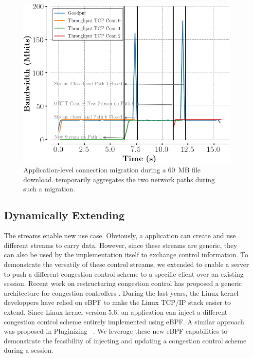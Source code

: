 \begin{figure}[!t]
  \begin{center}
    \includegraphics[width=\columnwidth]{figures/migration.png}
  \end{center}
\vspace{-0.5cm}
  \caption{Application-level connection migration during a 60~MB file download.
    \tcpls temporarily aggregates the two network paths during such a migration.}
  \label{fig:conn_migration}
\end{figure}



\subsection{Dynamically Extending \tcpls}

The \tcpls streams enable new use case. Obviously, a \tcpls application can
create and use different streams to carry data. However, since these streams
are generic, they can also be used by the \tcpls implementation itself to
exchange control information. To demonstrate the versatily of these control
streams, we extended \tcpls to enable a server to push a different congestion
control scheme to a specific client over an existing \tcpls session. Recent
work on restructuring congestion control has proposed a generic architecture
for congestion controllers \cite{narayan2018restructuring}.
During the last years, the Linux kernel developpers have relied on eBPF
to make the Linux TCP/IP stack \cite{brakmo2017tcp,tran2020beyond} easier
to extend. Since Linux kernel version 5.6, an application can inject
a different congestion control scheme entirely implemented using eBPF. A similar
approach was proposed in Pluginizing \quic~\cite{de2019pluginizing}. We
leverage these new eBPF capabilities to demonstrate the feasibility of injecting
and updating a congestion control scheme during a \tcpls session.

